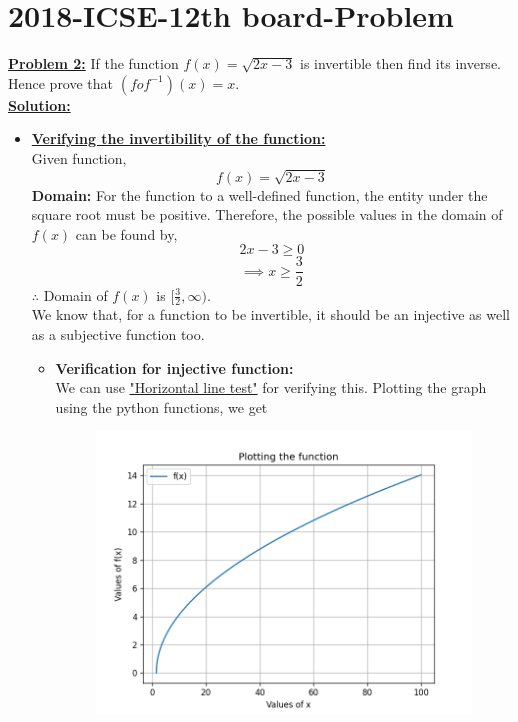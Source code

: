 \documentclass[journal,12pt,twocolumn]{IEEEtran}
\begin{document}
	\section{2018-ICSE-12th board-Problem}
\textbf{\underline{Problem 2:}} If the function $f(x)=\sqrt{2x-3}$ is invertible then find its inverse. Hence prove that $(fof^{-1})(x)=x$.\\
	\textbf{\underline{Solution:} }
	\begin{itemize}
	\item
	\textbf{\underline{Verifying the invertibility of the function:}}\\
	Given function,
	\begin{equation} \label{eq:1.0}
	f(x) = \sqrt{2x-3}
	\end{equation}
	\textbf{Domain:} For the function to a well-defined function, the entity under the square root must be positive. Therefore, the possible values in the domain of $f(x)$ can be found by,
	\begin{equation}
	2x - 3 \geq 0
	\end{equation}
	\begin{equation}
	\implies x \geq \frac{3}{2}
	\end{equation}
	$\therefore$ Domain of $f(x)$ is $[\frac{3}{2},\infty)$.\\
	We know that, for a function to be invertible, it should be an injective as well as a subjective function too.
	\begin{itemize}
	\item
	\textbf{Verification for injective function:}\\
	We can use \underline{"Horizontal line test"} for verifying this. Plotting the graph using the python functions, we get
	\begin{figure}[htb]
		\centering
		\includegraphics[width=\columnwidth]{Fig_1.png}

\end{figure}
\end{itemize}
\end{itemize}
\end{document}

